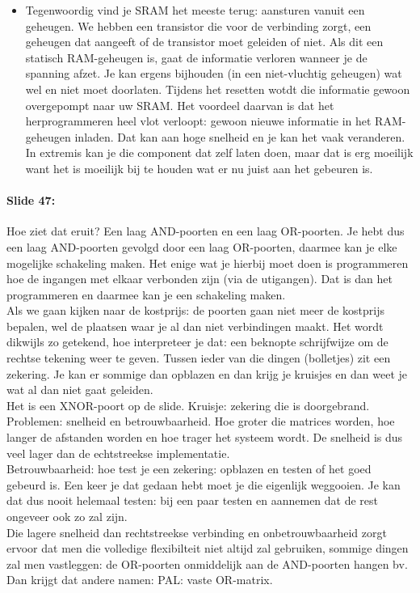 \documentclass[10pt,a4paper]{book}
\begin{document}
\begin{itemize}
\item Tegenwoordig vind je SRAM het meeste terug: aansturen vanuit een geheugen. We hebben een transistor die voor de verbinding zorgt, een geheugen dat aangeeft of de transistor moet geleiden of niet. Als dit een statisch RAM-geheugen is, gaat de informatie verloren wanneer je de spanning afzet. Je kan ergens bijhouden (in een niet-vluchtig geheugen) wat wel en niet moet doorlaten. Tijdens het resetten wotdt die informatie gewoon overgepompt naar uw SRAM. Het voordeel daarvan is dat het herprogrammeren heel vlot verloopt: gewoon nieuwe informatie in het RAM-geheugen inladen. Dat kan aan hoge snelheid en je kan het vaak veranderen. In extremis kan je die component dat zelf laten doen, maar dat is erg moeilijk want het is moeilijk bij te houden wat er nu juist aan het gebeuren is.
\end{itemize}

\paragraph{Slide 47:} Hoe ziet dat eruit? Een laag AND-poorten en een laag OR-poorten. Je hebt dus een laag AND-poorten gevolgd door een laag OR-poorten, daarmee kan je elke mogelijke schakeling maken. Het enige wat je hierbij moet doen is programmeren hoe de ingangen met elkaar verbonden zijn (via de utigangen). Dat is dan het programmeren en daarmee kan je een schakeling maken. \\
Als we gaan kijken naar de kostprijs: de poorten gaan niet meer de kostprijs bepalen, wel de plaatsen waar je al dan niet verbindingen maakt. Het wordt dikwijls zo getekend, hoe interpreteer je dat: een beknopte schrijfwijze om de rechtse tekening weer te geven. Tussen ieder van die dingen (bolletjes) zit een zekering. Je kan er sommige dan opblazen en dan krijg je kruisjes en dan weet je wat al dan niet gaat geleiden.\\
Het is een XNOR-poort op de slide. Kruisje: zekering die is doorgebrand.\\
Problemen: snelheid en betrouwbaarheid. Hoe groter die matrices worden, hoe langer de afstanden worden en hoe trager het systeem wordt. De snelheid is dus veel lager dan de echtstreekse implementatie.\\
Betrouwbaarheid: hoe test je een zekering: opblazen en testen of het goed gebeurd is. Een keer je dat gedaan hebt moet je die eigenlijk weggooien. Je kan dat dus nooit helemaal testen: bij een paar testen en aannemen dat de rest ongeveer ook zo zal zijn.\\
Die lagere snelheid dan rechtstreekse verbinding en onbetrouwbaarheid zorgt ervoor dat men die volledige flexibilteit niet altijd zal gebruiken, sommige dingen zal men vastleggen: de OR-poorten onmiddelijk aan de AND-poorten hangen bv.\\
Dan krijgt dat andere namen: PAL: vaste OR-matrix. 
\end{document}
